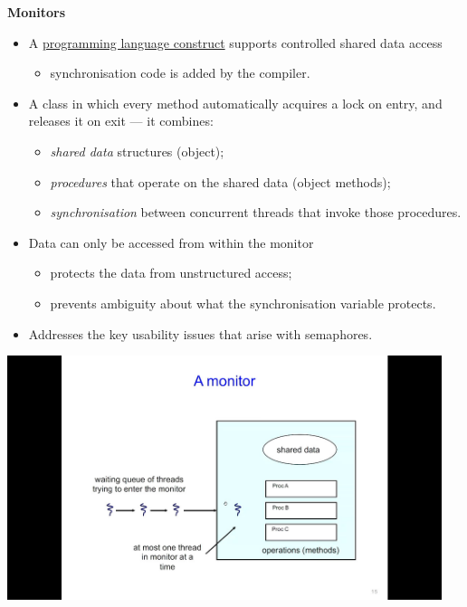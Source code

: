 \documentclass[11pt,a4paper]{article}
\begin{document}
\textbf{Monitors}
\begin{itemize}
    \item A \underline{programming language construct} supports controlled shared data access
        \begin{itemize}
            \item synchronisation code is added by the compiler.
        \end{itemize}
    \item A class in which every method automatically acquires a lock on entry,
        and releases it on exit --- it combines:
        \begin{itemize}
            \item \emph{shared data} structures (object);
            \item \emph{procedures} that operate on the shared data (object methods);
            \item \emph{synchronisation} between concurrent threads that invoke those
                procedures.
        \end{itemize}
    \item Data can only be accessed from within the monitor
        \begin{itemize}
            \item protects the data from unstructured access;
            \item prevents ambiguity about what the synchronisation variable protects.
        \end{itemize}
    \item Addresses the key usability issues that arise with semaphores.
\end{itemize}

\includegraphics[height=270]{a-monitor.jpg}
\end{document}
